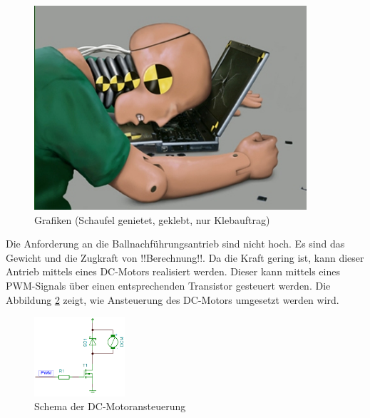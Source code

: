 \begin{figure}
	\centering
	\includegraphics[width=0.9\textwidth]{Enddokumentation/CrashTestDummy.jpg}
	\caption{Grafiken (Schaufel genietet, geklebt, nur Klebauftrag)}
	\label{fig:Grafiken (Schaufel genietet, geklebt, nur Klebauftrag)}	
\end{figure}

Die Anforderung an die Ballnachführungsantrieb sind nicht hoch. Es sind das Gewicht und die Zugkraft von !!Berechnung!!. Da die Kraft gering ist, kann dieser Antrieb mittels eines DC-Motors realisiert werden. Dieser kann mittels eines PWM-Signals über einen entsprechenden Transistor gesteuert werden. Die Abbildung \ref{fig:Schema_DC-Motor} zeigt, wie Ansteuerung des DC-Motors umgesetzt werden wird.
	\begin{figure}[h!] %
		\centering
		\includegraphics[width=0.3\textwidth]{Enddokumentation/Loesungskonzept/Bilder/SchemaDcMotor.png}
		\caption{Schema der DC-Motoransteuerung}
		\label{fig:Schema_DC-Motor}
	\end{figure}